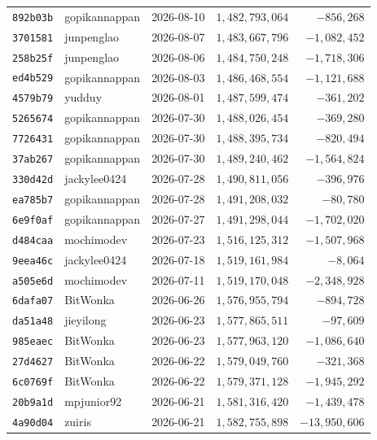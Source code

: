 {\begin{longtable}{@{}lllrr@{}}
\texttt{892b03b} & gopikannappan & 2026-08-10 & $1{,}482{,}793{,}064$ & $-856{,}268$\\
\texttt{3701581} & junpenglao & 2026-08-07 & $1{,}483{,}667{,}796$ & $-1{,}082{,}452$\\
\texttt{258b25f} & junpenglao & 2026-08-06 & $1{,}484{,}750{,}248$ & $-1{,}718{,}306$\\
\texttt{ed4b529} & gopikannappan & 2026-08-03 & $1{,}486{,}468{,}554$ & $-1{,}121{,}688$\\
\texttt{4579b79} & yudduy & 2026-08-01 & $1{,}487{,}599{,}474$ & $-361{,}202$\\
\texttt{5265674} & gopikannappan & 2026-07-30 & $1{,}488{,}026{,}454$ & $-369{,}280$\\
\texttt{7726431} & gopikannappan & 2026-07-30 & $1{,}488{,}395{,}734$ & $-820{,}494$\\
\texttt{37ab267} & gopikannappan & 2026-07-30 & $1{,}489{,}240{,}462$ & $-1{,}564{,}824$\\
\texttt{330d42d} & jackylee0424 & 2026-07-28 & $1{,}490{,}811{,}056$ & $-396{,}976$\\
\texttt{ea785b7} & gopikannappan & 2026-07-28 & $1{,}491{,}208{,}032$ & $-80{,}780$\\
\texttt{6e9f0af} & gopikannappan & 2026-07-27 & $1{,}491{,}298{,}044$ & $-1{,}702{,}020$\\
\texttt{d484caa} & mochimodev & 2026-07-23 & $1{,}516{,}125{,}312$ & $-1{,}507{,}968$\\
\texttt{9eea46c} & jackylee0424 & 2026-07-18 & $1{,}519{,}161{,}984$ & $-8{,}064$\\
\texttt{a505e6d} & mochimodev & 2026-07-11 & $1{,}519{,}170{,}048$ & $-2{,}348{,}928$\\
\texttt{6dafa07} & BitWonka & 2026-06-26 & $1{,}576{,}955{,}794$ & $-894{,}728$\\
\texttt{da51a48} & jieyilong & 2026-06-23 & $1{,}577{,}865{,}511$ & $-97{,}609$\\
\texttt{985eaec} & BitWonka & 2026-06-23 & $1{,}577{,}963{,}120$ & $-1{,}086{,}640$\\
\texttt{27d4627} & BitWonka & 2026-06-22 & $1{,}579{,}049{,}760$ & $-321{,}368$\\
\texttt{6c0769f} & BitWonka & 2026-06-22 & $1{,}579{,}371{,}128$ & $-1{,}945{,}292$\\
\texttt{20b9a1d} & mpjunior92 & 2026-06-21 & $1{,}581{,}316{,}420$ & $-1{,}439{,}478$\\
\texttt{4a90d04} & zuiris & 2026-06-21 & $1{,}582{,}755{,}898$ & $-13{,}950{,}606$\\

\end{longtable}}
